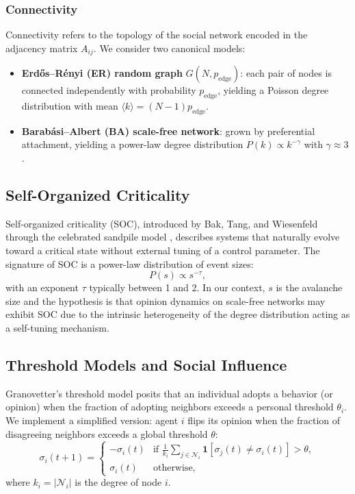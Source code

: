 \documentclass[11pt,twocolumn]{article}
\begin{document}
\subsubsection{Connectivity}

Connectivity refers to the topology of the social network encoded in the adjacency matrix $A_{ij}$. We consider two canonical models:

\begin{itemize}
\item \textbf{Erd\H{o}s--R\'enyi (ER) random graph} $G(N, p_{\text{edge}})$: each pair of nodes is connected independently with probability $p_{\text{edge}}$, yielding a Poisson degree distribution with mean $\langle k \rangle = (N-1)p_{\text{edge}}$.
\item \textbf{Barab\'asi--Albert (BA) scale-free network}: grown by preferential attachment, yielding a power-law degree distribution $P(k) \propto k^{-\gamma}$ with $\gamma \approx 3$ \citep{Barabasi1999}.
\end{itemize}

\subsection{Self-Organized Criticality}

Self-organized criticality (SOC), introduced by Bak, Tang, and Wiesenfeld through the celebrated sandpile model \citep{BTW1987}, describes systems that naturally evolve toward a critical state without external tuning of a control parameter. The signature of SOC is a power-law distribution of event sizes:
\begin{equation}
P(s) \propto s^{-\tau},
\end{equation}
with an exponent $\tau$ typically between 1 and 2. In our context, $s$ is the avalanche size and the hypothesis is that opinion dynamics on scale-free networks may exhibit SOC due to the intrinsic heterogeneity of the degree distribution acting as a self-tuning mechanism.

\subsection{Threshold Models and Social Influence}

Granovetter's threshold model \citep{Granovetter1978} posits that an individual adopts a behavior (or opinion) when the fraction of adopting neighbors exceeds a personal threshold $\theta_i$. We implement a simplified version: agent $i$ flips its opinion when the fraction of disagreeing neighbors exceeds a global threshold $\theta$:
\begin{equation}
\sigma_i(t+1) = \begin{cases} -\sigma_i(t) & \text{if } \frac{1}{k_i}\sum_{j \in \mathcal{N}_i} \mathbf{1}[\sigma_j(t) \neq \sigma_i(t)] > \theta,\\ \sigma_i(t) & \text{otherwise,} \end{cases}
\end{equation}
where $k_i = |\mathcal{N}_i|$ is the degree of node $i$.
\end{document}
